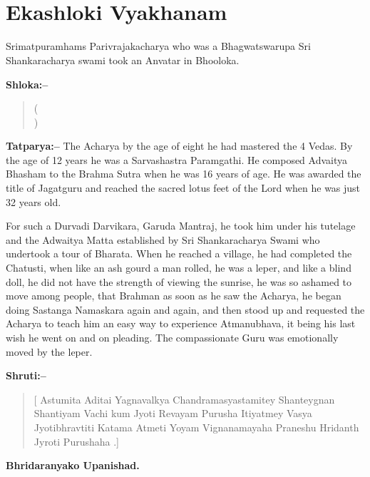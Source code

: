 \chapter[Sri Ganeshayanamaha Ekashloki Vyakhanam]{\\ Ekashloki Vyakhanam}

Srimatpuramhams Parivrajakacharya who was a Bhagwatswarupa Sri Shankaracharya swami took an Anvatar in Bhooloka.

\textbf{Shloka:–}

\begin{verse}
 (\\)
\end{verse}

\textbf{Tatparya:–} The Acharya by the age of eight he had mastered the 4 Vedas. By the age of 12 years he was a Sarvashastra Paramgathi. He composed Advaitya Bhasham to the Brahma Sutra when he was 16 years of age. He was awarded the title of Jagatguru and reached the sacred lotus feet of the Lord when he was just 32 years old.

For such a Durvadi Darvikara, Garuda Mantraj, he took him under his tutelage and the Adwaitya Matta established by Sri Shankaracharya Swami who undertook a tour of Bharata. When he reached a village, he had completed the Chatusti, when like an ash gourd a man rolled, he was a leper, and like a blind doll, he did not have the strength of viewing the sunrise, he was so ashamed to move among people, that Brahman as soon as he saw the Acharya, he began doing Sastanga Namaskara again and again, and then stood up and requested the Acharya to teach him an easy way to experience Atmanubhava, it being his last wish he went on and on pleading. The compassionate Guru was emotionally moved by the leper.

\newpage

\textbf{Shruti:–}

\begin{verse}
[ Astumita Aditai Yagnavalkya Chandramasyasta\break mitey  Shanteygnan Shantiyam Vachi kum Jyoti Reva\break yam Purusha  Itiyatmey Vasya Jyotibhravtiti  Katama Atmeti Yoyam Vignanamayaha Praneshu Hridanth Jyroti Purushaha .]
\end{verse}

\begin{flushright}
\textbf{Bhridaranyako Upanishad.}
\end{flushright}

